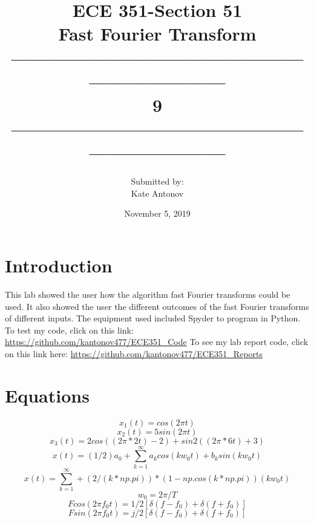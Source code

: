 \documentclass[12pt]{article}
\title{ECE 351-Section 51 \\ Fast Fourier Transform
 \\ ------------------------------------------------------------------\\ 9 \\------------------------------------------------------------------}
\author{Submitted by: \\  Kate Antonov}
\date{November 5, 2019}
\begin{document}
\vspace{\fill}

\maketitle

\vspace{\fill}
\thispagestyle{empty}
\clearpage

\clearpage
\thispagestyle{empty}
\tableofcontents
\clearpage

\section{Introduction}
This lab showed the user how the algorithm fast Fourier transforms could be used. It also showed the user the different outcomes of the fast Fourier transforms of different inputs.
\newline
The equipment used included Spyder to program in Python. To test my code, click on this link: 
\url{https://github.com/kantonov477/ECE351_Code}
\newline
To see my lab report code, click on this link here: 
\url{https://github.com/kantonov477/ECE351_Reports}
\section{Equations}
\[x_1(t) = cos(2\pi t)\]
\[x_2(t) = 5sin(2\pi t)\]
\[x_3(t) = 2cos((2\pi * 2t) − 2) + sin2
((2\pi * 6t) + 3)\]
\[x(t) = (1/2)a_0 + \sum_{k=1}^{\infty} a_kcos(kw_0t) + b_ksin(kw_0t)\] 
\[x(t) = \sum_{k=1}^{\infty} + (2/(k*np.pi))*(1 - np.cos(k*np.pi))(kw_0t)\]
\[w_0 = 2\pi/T\]
\[F {cos (2\pi f_0t)} =1/2[\delta (f − f_0) + \delta (f + f_0)]\]
\[F {sin (2\pi f_0t)} =j/2[\delta (f − f_0) + \delta (f + f_0)]\]
\end{document}
